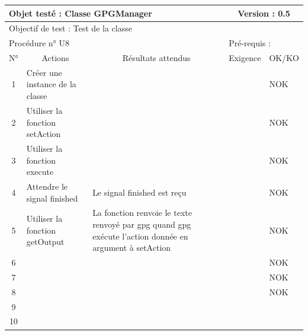 \documentclass{../res/univ-projet}
\begin{document}
\begin{center}
    \begin{tabular}{|c|p{5cm}|p{5cm}|p{1.5cm}|p{1.5cm}|}
      \hline
      \multicolumn{3}{|l|}{Objet testé : Classe GPGManager} & \multicolumn{2}{c|}{Version : 0.5}\\ \hline
      \multicolumn{5}{|l|}{Objectif de test : Test de la classe}\\ \hline
      \multicolumn{3}{|l|}{Procédure n° U8} & \multicolumn{2}{p{3cm}|}{Pré-requis : }\\ \hline
      \multicolumn{1}{|c|}{N°} & \multicolumn{1}{c|}{Actions} & \multicolumn{1}{c|}{Résultats attendus} & 
      \multicolumn{1}{c|}{Exigence} & \multicolumn{1}{c|}{OK/KO}\\ \hline
      1 & Créer une instance de la classe &  &  & NOK \\
      2 & Utiliser la fonction setAction &  &  & NOK \\
      3 & Utiliser la fonction execute &  &  & NOK \\
      4 & Attendre le signal finished & Le signal finished est reçu &  & NOK \\
      5 & Utiliser la fonction getOutput & La fonction renvoie le texte renvoyé par gpg quand gpg exécute l'action donnée en argument à setAction &  & NOK \\
	    6 & &  &  & NOK \\
      7 &  &  &  & NOK \\
      8 &  &  &  & NOK \\
      9 &  &  &  & \\
      10 &  &  &  & \\ 
	\hline
    \end{tabular}
    \vskip 2.2cm
	


\end{center}
\end{document}
